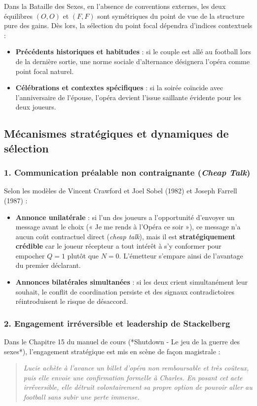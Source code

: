 \documentclass[11pt,a4paper]{article}
\begin{document}
Dans la Bataille des Sexes, en l'absence de conventions externes, les deux équilibres $(O,O)$ et $(F,F)$ sont symétriques du point de vue de la structure pure des gains. Dès lors, la sélection du point focal dépendra d'indices contextuels :
\begin{itemize}[leftmargin=1.5em]
    \item \textbf{Précédents historiques et habitudes} : si le couple est allé au football lors de la dernière sortie, une norme sociale d'alternance désignera l'opéra comme point focal naturel.
    \item \textbf{Célébrations et contextes spécifiques} : si la soirée coïncide avec l'anniversaire de l'épouse, l'opéra devient l'issue saillante évidente pour les deux joueurs.
\end{itemize}

\subsection{Mécanismes stratégiques et dynamiques de sélection}

\subsubsection{1. Communication préalable non contraignante (\emph{Cheap Talk})}
Selon les modèles de Vincent Crawford et Joel Sobel (1982) et Joseph Farrell (1987) :
\begin{itemize}[leftmargin=1.5em]
    \item \textbf{Annonce unilatérale} : si l'un des joueurs a l'opportunité d'envoyer un message avant le choix (« Je me rends à l'Opéra ce soir »), ce message n'a aucun coût contractuel direct (\emph{cheap talk}), mais il est \textbf{stratégiquement crédible} car le joueur récepteur a tout intérêt à s'y conformer pour empocher $Q=1$ plutôt que $N=0$. L'émetteur s'empare ainsi de l'avantage du premier déclarant.
    \item \textbf{Annonces bilatérales simultanées} : si les deux crient simultanément leur souhait, le conflit de coordination persiste et des signaux contradictoires réintroduisent le risque de désaccord.
\end{itemize}

\subsubsection{2. Engagement irréversible et leadership de Stackelberg}
Dans le Chapitre 15 du manuel de cours (*Shutdown - Le jeu de la guerre des sexes*), l'engagement stratégique est mis en scène de façon magistrale :
\begin{quote}
\textit{Lucie achète à l'avance un billet d'opéra non remboursable et très coûteux, puis elle envoie une confirmation formelle à Charles. En posant cet acte irréversible, elle détruit volontairement sa propre option de pouvoir aller au football sans subir une perte immense.}
\end{quote}
\end{document}
